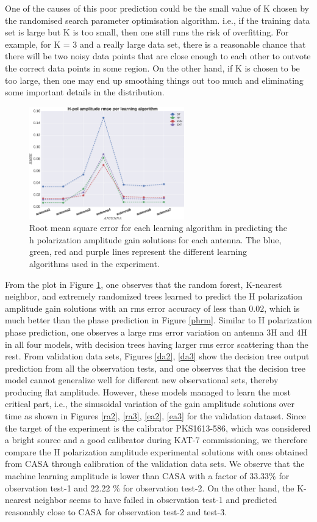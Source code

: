 One of the causes of this poor prediction could be the small value of K chosen by the randomised search parameter optimisation algorithm. i.e., if the training data set is large but K is too small, then one still runs the risk of overfitting. For example, for K = 3 and a really large data set, there is a reasonable chance that there will be two noisy data points that are close enough to each other to outvote the correct data points in some region. On the other hand, if K is chosen to be too large, then one may end up smoothing things out too much and eliminating some important details in the distribution. 
\begin{figure}[H]
  \centering
    \includegraphics[width=0.6\textwidth]{images/Hpol-amp.eps}
    \caption{Root mean square error for each learning algorithm in predicting the h polarization amplitude gain solutions for each antenna. The blue, green, red and purple lines represent the different learning algorithms used in the experiment.}
  \label{amprm}
 \end{figure} 

From the plot in Figure \ref{amprm}, one observes that the random forest, K-nearest neighbor, and extremely randomized trees learned to predict the H polarization amplitude gain solutions with an rms error accuracy of less than $0.02$, which is much better than the phase prediction in Figure \ref{phrm}. Similar to H polarization phase prediction, one observes a large rms error variation on antenna 3H and 4H in all four models, with decision trees having larger rms error scattering than the rest. From validation data sets, Figures \ref{da2}, \ref{da3} show the decision tree output prediction from all the observation tests, and one observes that the decision tree model cannot generalize well for different new observational sets, thereby producing flat amplitude. However, these models managed to learn the most critical part, i.e., the sinusoidal variation of the gain amplitude solutions over time as shown in Figures \ref{ra2}, \ref{ra3}, \ref{ea2}, \ref{ea3} for the validation dataset. Since the target of the experiment is the calibrator PKS1613-586, which was considered a bright source and a good calibrator during KAT-7 commissioning, we therefore compare the H polarization amplitude experimental solutions with ones obtained from CASA through calibration of the validation data sets. We observe that the machine learning amplitude is lower than CASA with a factor of 33.33$\%$ for observation test-1 and 22.22 $\%$ for observation test-2. On the other hand, the K-nearest neighbor seems to have failed in observation test-1 and predicted reasonably close to CASA for observation test-2 and test-3.

